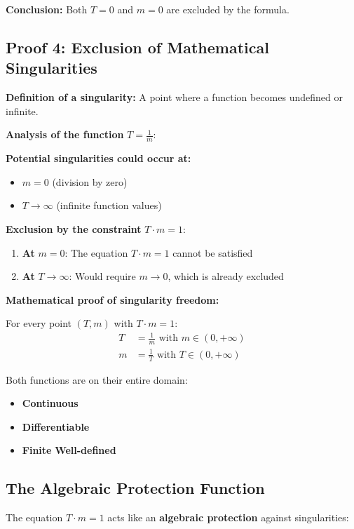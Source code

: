 	\textbf{Conclusion:} Both $T = 0$ and $m = 0$ are excluded by the formula.
	
	\subsection{Proof 4: Exclusion of Mathematical Singularities}
	
	\textbf{Definition of a singularity:} A point where a function becomes undefined or infinite.
	
	\textbf{Analysis of the function} $T = \frac{1}{m}$:
	
	\textbf{Potential singularities could occur at:}
	\begin{itemize}
		\item $m = 0$ (division by zero)
		\item $T \to \infty$ (infinite function values)
	\end{itemize}
	
	\textbf{Exclusion by the constraint} $T \cdot m = 1$:
	\begin{enumerate}
		\item \textbf{At} $m = 0$: The equation $T \cdot m = 1$ cannot be satisfied
		\item \textbf{At} $T \to \infty$: Would require $m \to 0$, which is already excluded
	\end{enumerate}
	
	\textbf{Mathematical proof of singularity freedom:}
	
	For every point $(T,m)$ with $T \cdot m = 1$:
	\begin{align}
		T &= \frac{1}{m} \text{ with } m \in (0, +\infty)\\
		m &= \frac{1}{T} \text{ with } T \in (0, +\infty)
	\end{align}
	
	Both functions are on their entire domain:
	\begin{itemize}
		\item \textbf{Continuous}
		\item \textbf{Differentiable}
		\item \textbf{Finite}
		\textbf{Well-defined}
	\end{itemize}
	
	\subsection{The Algebraic Protection Function}
	
	The equation $T \cdot m = 1$ acts like an \textbf{algebraic protection} against singularities:
	
